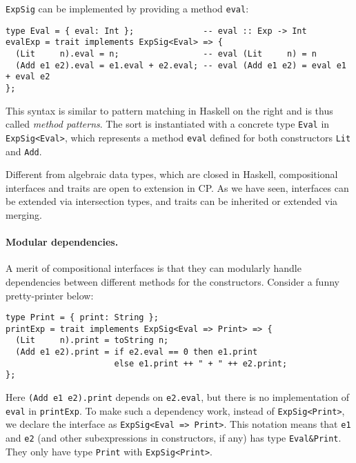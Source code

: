 \lstinline{ExpSig} can be implemented by providing a method \lstinline{eval}:
\begin{lstlisting}
type Eval = { eval: Int };              -- eval :: Exp -> Int
evalExp = trait implements ExpSig<Eval> => {
  (Lit     n).eval = n;                 -- eval (Lit     n) = n
  (Add e1 e2).eval = e1.eval + e2.eval; -- eval (Add e1 e2) = eval e1 + eval e2
};
\end{lstlisting}
This syntax is similar to pattern matching in Haskell on the right and is thus
called \emph{method patterns}. The sort is instantiated with a concrete type
\lstinline{Eval} in \lstinline{ExpSig<Eval>}, which represents a method
\lstinline{eval} defined for both constructors \lstinline{Lit} and
\lstinline{Add}.

\begin{tipblock}
Different from algebraic data types, which are closed in Haskell, compositional
interfaces and traits are open to extension in CP. As we have seen, interfaces
can be extended via intersection types, and traits can be inherited or extended
via merging.
\end{tipblock}

\paragraph{Modular dependencies.}
A merit of compositional interfaces is that they can modularly handle
dependencies between different methods for the constructors. Consider a funny
pretty-printer below:
\begin{lstlisting}
type Print = { print: String };
printExp = trait implements ExpSig<Eval => Print> => {
  (Lit     n).print = toString n;
  (Add e1 e2).print = if e2.eval == 0 then e1.print
                      else e1.print ++ " + " ++ e2.print;
};
\end{lstlisting}
Here \lstinline{(Add e1 e2).print} depends on \lstinline{e2.eval}, but there is
no implementation of \lstinline{eval} in \lstinline{printExp}. To make such a
dependency work, instead of \lstinline{ExpSig<Print>}, we declare the interface
as \lstinline{ExpSig<Eval => Print>}. This notation means that \lstinline{e1}
and \lstinline{e2} (and other subexpressions in constructors, if any) has type
\lstinline{Eval&Print}. They only have type \lstinline{Print} with
\lstinline{ExpSig<Print>}.

